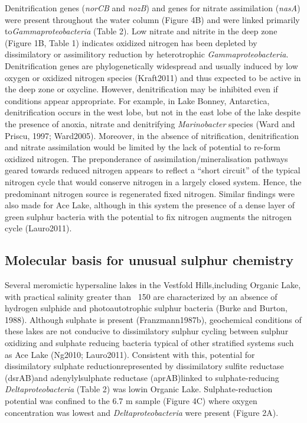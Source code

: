 {{Denitrification genes (\emph{norCB} and \emph{nozB}) and genes for nitrate assimilation (\emph{nasA}) were present throughout the water column (Figure 4B) and were linked primarily to\emph{Gammaproteobacteria} (Table 2). 
Low nitrate and nitrite in the deep zone (Figure 1B, Table 1) indicates oxidized nitrogen has been depleted by dissimilatory or assimilitory reduction by heterotrophic \emph{Gammaproteobacteria}. 
Denitrification genes are phylogenetically widespread and usually induced by low oxygen or oxidized nitrogen species (Kraft2011) and thus expected to be active in the deep zone or oxycline. 
However, denitrification may be inhibited even if conditions appear appropriate. 
For example, in Lake Bonney, Antarctica, denitrification occurs in the west lobe, but not in the east lobe of the lake despite the presence of anoxia, nitrate and denitrifying \emph{Marinobacter} species (Ward and Priscu, 1997; Ward2005).
 Moreover, in the absence of nitrification, denitrification and nitrate assimilation would be limited by the lack of potential to re-form oxidized nitrogen. 
The preponderance of assimilation/mineralisation pathways geared towards reduced nitrogen appears to reflect a “short circuit” of the typical nitrogen cycle that would conserve nitrogen in a largely closed system. 
Hence, the predominant nitrogen source is regenerated fixed nitrogen.
Similar findings were also made for Ace Lake, although in this system the presence of a dense layer of green sulphur bacteria with the potential to fix nitrogen augments the nitrogen cycle (Lauro2011). 

\subsection{Molecular basis for unusual sulphur chemistry}
Several meromictic hypersaline lakes in the Vestfold Hills,including Organic Lake, with practical salinity greater than ~150 are characterized by an absence of hydrogen sulphide and photoautotrophic sulphur bacteria (Burke and Burton, 1988). Although sulphate is present (Franzmann1987b), geochemical conditions of these lakes are not conducive to dissimilatory sulphur cycling between sulphur oxidizing and sulphate reducing bacteria typical of other stratified systems such as Ace Lake (Ng2010; Lauro2011). Consistent with this, potential for dissimilatory sulphate reductionrepresented by dissimilatory sulfite reductase (dsrAB)and adenylylsulphate reductase (aprAB)linked to sulphate-reducing \emph{Deltaproteobacteria} (Table 2) was lowin Organic Lake. Sulphate-reduction potential was confined to the 6.7 m sample (Figure 4C) where oxygen concentration was lowest and \emph{Deltaproteobacteria} were present (Figure 2A).

}}
